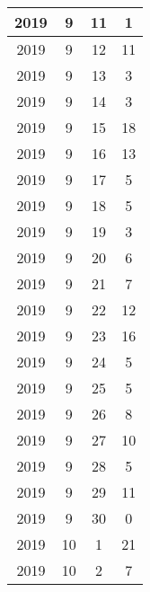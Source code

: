 \begin{longtable} {|c|c|c|c|}
\hline
2019         & 9            & 11           & 1                         \\ 
\hline
2019         & 9            & 12           & 11                        \\ 
\hline
2019         & 9            & 13           & 3                         \\ 
\hline
2019         & 9            & 14           & 3                         \\ 
\hline
2019         & 9            & 15           & 18                        \\ 
\hline
2019         & 9            & 16           & 13                        \\ 
\hline
2019         & 9            & 17           & 5                         \\ 
\hline
2019         & 9            & 18           & 5                         \\ 
\hline
2019         & 9            & 19           & 3                         \\ 
\hline
2019         & 9            & 20           & 6                         \\ 
\hline
2019         & 9            & 21           & 7                         \\ 
\hline
2019         & 9            & 22           & 12                        \\ 
\hline
2019         & 9            & 23           & 16                        \\ 
\hline
2019         & 9            & 24           & 5                         \\ 
\hline
2019         & 9            & 25           & 5                         \\ 
\hline
2019         & 9            & 26           & 8                         \\ 
\hline
2019         & 9            & 27           & 10                        \\ 
\hline
2019         & 9            & 28           & 5                         \\ 
\hline
2019         & 9            & 29           & 11                        \\ 
\hline
2019         & 9            & 30           & 0                         \\ 
\hline
2019         & 10           & 1            & 21                        \\ 
\hline
2019         & 10           & 2            & 7                         \\ 

\end{longtable}
